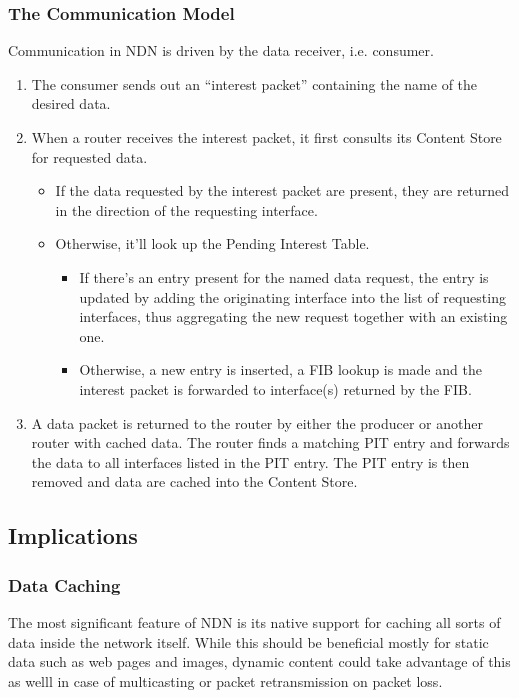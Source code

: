                 \subsubsection{The Communication Model}

                Communication in NDN is driven by the data receiver, i.e. consumer.

                \begin{enumerate}
                    \item The consumer sends out an ``interest packet'' containing the name of the desired data.
                    \item When a router receives the interest packet, it first consults its Content Store for requested data.
                        \begin{itemize}
                            \item If the data requested by the interest packet are present, they are returned in the direction of the requesting interface.
                            \item Otherwise, it'll look up the Pending Interest Table.
                            \begin{itemize}
                                \item If there's an entry present for the named data request, the entry is updated by adding the originating interface into the list of requesting interfaces, thus aggregating the new request together with an existing one.
                                \item Otherwise, a new entry is inserted, a FIB lookup is made and the interest packet is forwarded to interface(s) returned by the FIB.
                            \end{itemize}
                        \end{itemize}
                    \item A data packet is returned to the router by either the producer or another router with cached data. The router finds a matching PIT entry and forwards the data to all interfaces listed in the PIT entry. The PIT entry is then removed and data are cached into the Content Store.
                \end{enumerate}

        \subsection{Implications}
            \subsubsection{Data Caching}
                The most significant feature of NDN is its native support for caching all sorts of data inside the network itself. While this should be beneficial mostly for static data such as web pages and images, dynamic content could take advantage of this as welll in case of multicasting or packet retransmission on packet loss.


